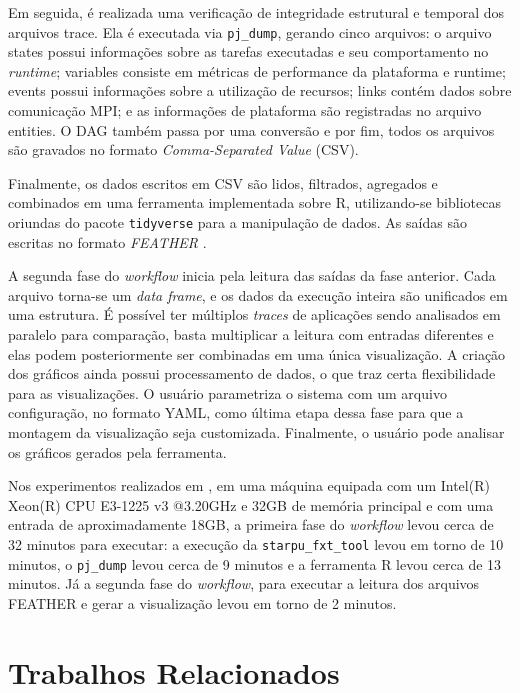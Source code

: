 Em seguida, é realizada uma verificação de integridade estrutural e temporal dos
arquivos trace. Ela é executada via \texttt{pj\_dump}, gerando cinco arquivos: o arquivo states 
possui informações sobre as tarefas executadas e seu comportamento no \emph{runtime}; variables
consiste em métricas de performance da plataforma e runtime; events possui informações sobre a 
utilização de recursos; links contém dados sobre comunicação MPI; e as informações de plataforma 
são registradas no arquivo entities. O DAG também passa por uma conversão e por fim, todos os 
arquivos são gravados no formato \emph{Comma-Separated Value} (CSV).

Finalmente, os dados escritos em CSV são lidos, filtrados, agregados e combinados em 
uma ferramenta implementada sobre R, utilizando-se bibliotecas oriundas do pacote 
\texttt{tidyverse} para a manipulação de dados. As saídas são escritas no formato \emph{FEATHER}
\cite{ref:feather}.

A segunda fase do \emph{workflow} inicia pela leitura das saídas da fase anterior. Cada arquivo
torna-se um \emph{data frame}, e os dados da execução inteira são unificados em uma estrutura.
É possível ter múltiplos \emph{traces} de aplicações sendo analisados em paralelo
para comparação, basta multiplicar a leitura com entradas diferentes e 
elas podem posteriormente ser combinadas em uma única visualização. A criação dos gráficos ainda 
possui processamento de dados, o que traz certa flexibilidade para as visualizações. O usuário 
parametriza o sistema com um arquivo configuração, no formato YAML, como última etapa dessa fase
para que a montagem da visualização seja customizada. Finalmente, o usuário pode analisar os 
gráficos gerados pela ferramenta.

Nos experimentos realizados em \citet{ref:starvz}, em uma máquina equipada com um Intel(R) Xeon(R) 
CPU E3-1225 v3 @3.20GHz e 32GB de memória principal e com uma entrada de aproximadamente 18GB, a 
primeira fase do \emph{workflow} levou cerca de 32 minutos para executar: a execução da \texttt{starpu\_fxt\_tool}
levou em torno de 10 minutos, o \texttt{pj\_dump} levou cerca de 9 minutos e a ferramenta R levou cerca de 13
minutos. Já a segunda fase do \emph{workflow}, para executar a leitura dos arquivos FEATHER e gerar
a visualização levou em torno de 2 minutos.

\section{Trabalhos Relacionados}\label{sect:related-work}


